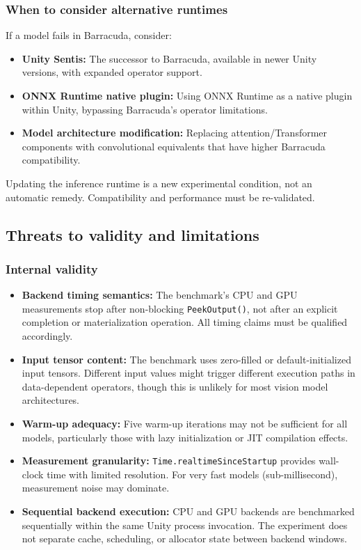 \documentclass[10pt,twocolumn]{article}
\begin{document}
\subsubsection{When to consider alternative runtimes}

If a model fails in Barracuda, consider:
\begin{itemize}[nosep,leftmargin=*]
  \item \textbf{Unity Sentis:} The successor to Barracuda, available in newer Unity versions, with expanded operator support.
  \item \textbf{ONNX Runtime native plugin:} Using ONNX Runtime as a native plugin within Unity, bypassing Barracuda's operator limitations.
  \item \textbf{Model architecture modification:} Replacing attention/Transformer components with convolutional equivalents that have higher Barracuda compatibility.
\end{itemize}

Updating the inference runtime is a new experimental condition, not an automatic remedy. Compatibility and performance must be re-validated.

\subsection{Threats to validity and limitations}\label{sec:limitations}

\subsubsection{Internal validity}

\begin{itemize}[nosep,leftmargin=*]
  \item \textbf{Backend timing semantics:} The benchmark's CPU and GPU measurements stop after non-blocking \texttt{PeekOutput()}, not after an explicit completion or materialization operation. All timing claims must be qualified accordingly.
  \item \textbf{Input tensor content:} The benchmark uses zero-filled or default-initialized input tensors. Different input values might trigger different execution paths in data-dependent operators, though this is unlikely for most vision model architectures.
  \item \textbf{Warm-up adequacy:} Five warm-up iterations may not be sufficient for all models, particularly those with lazy initialization or JIT compilation effects.
  \item \textbf{Measurement granularity:} \texttt{Time.realtimeSinceStartup} provides wall-clock time with limited resolution. For very fast models (sub-millisecond), measurement noise may dominate.
  \item \textbf{Sequential backend execution:} CPU and GPU backends are benchmarked sequentially within the same Unity process invocation. The experiment does not separate cache, scheduling, or allocator state between backend windows.
\end{itemize}
\end{document}
